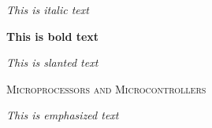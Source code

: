 \documentclass[12pt]{article}
\begin{document}
\textit{This is italic text}

\textbf{This is bold text}

\textsl{This is slanted text}

\textsc{Microprocessors and Microcontrollers}

\emph{This is emphasized text}
\end{document}
